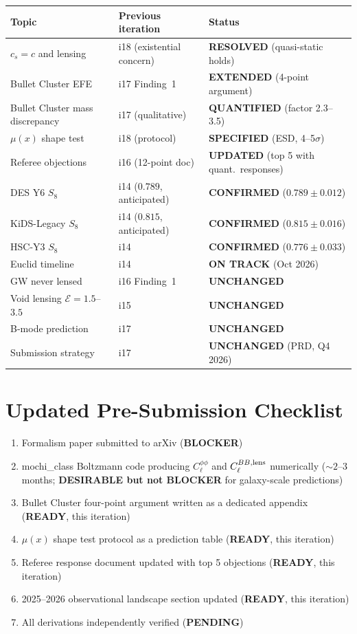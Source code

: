 \documentclass[11pt,a4paper]{article}
\begin{document}
\begin{center}
\begin{tabular}{lll}
\toprule
Topic & Previous iteration & Status \\
\midrule
$c_s = c$ and lensing & i18 (existential concern) & \textbf{RESOLVED} (quasi-static holds) \\
Bullet Cluster EFE & i17 Finding~1 & \textbf{EXTENDED} (4-point argument) \\
Bullet Cluster mass discrepancy & i17 (qualitative) & \textbf{QUANTIFIED} (factor 2.3--3.5) \\
$\mu(x)$ shape test & i18 (protocol) & \textbf{SPECIFIED} (ESD, 4--5$\sigma$) \\
Referee objections & i16 (12-point doc) & \textbf{UPDATED} (top 5 with quant.\ responses) \\
DES Y6 $S_8$ & i14 ($0.789$, anticipated) & \textbf{CONFIRMED} ($0.789 \pm 0.012$) \\
KiDS-Legacy $S_8$ & i14 ($0.815$, anticipated) & \textbf{CONFIRMED} ($0.815 \pm 0.016$) \\
HSC-Y3 $S_8$ & i14 & \textbf{CONFIRMED} ($0.776 \pm 0.033$) \\
Euclid timeline & i14 & \textbf{ON TRACK} (Oct 2026) \\
GW never lensed & i16 Finding~1 & \textbf{UNCHANGED} \\
Void lensing $\mathcal{E} = 1.5$--$3.5$ & i15 & \textbf{UNCHANGED} \\
B-mode prediction & i17 & \textbf{UNCHANGED} \\
Submission strategy & i17 & \textbf{UNCHANGED} (PRD, Q4 2026) \\
\bottomrule
\end{tabular}
\end{center}


\section*{Updated Pre-Submission Checklist}

\begin{enumerate}[label=\arabic*.]
\item Formalism paper submitted to arXiv (\textbf{BLOCKER})
\item mochi\_class Boltzmann code producing $C_\ell^{\phi\phi}$ and
  $C_\ell^{BB,\rm lens}$ numerically ($\sim 2$--$3$ months; \textbf{DESIRABLE
  but not BLOCKER} for galaxy-scale predictions)
\item Bullet Cluster four-point argument written as a dedicated appendix
  (\textbf{READY}, this iteration)
\item $\mu(x)$ shape test protocol as a prediction table (\textbf{READY},
  this iteration)
\item Referee response document updated with top 5 objections (\textbf{READY},
  this iteration)
\item 2025--2026 observational landscape section updated (\textbf{READY},
  this iteration)
\item All derivations independently verified (\textbf{PENDING})
\end{enumerate}
\end{document}
